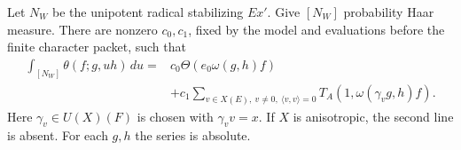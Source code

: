 \begin{srlemma}
\label{lem:sr-theta-kernel-constant-term}
Let \(N_W\) be the unipotent radical stabilizing \(Ex'\).
Give \([N_W]\) probability Haar measure. There are nonzero
\(c_0,c_1\), fixed by the model and evaluations before the finite
character packet, such that
\[
 \begin{split}
 \int_{[N_W]}\theta(f;g,uh)\,du
   ={}&c_0\Theta(e_0\omega(g,h)f)\\
     &+c_1\sum_{v\in X(E),\ v\ne0,\ \langle v,v\rangle=0}
       T_A(1,\omega(\gamma_vg,h)f).
 \end{split}
 \tag{T7}\label{eq:sr-theta-kernel-ct}
\]
Here \(\gamma_v\in U(X)(F)\) is chosen with \(\gamma_vv=x\).
If \(X\) is anisotropic, the second line is absent.
For each \(g,h\) the series is absolute.
\end{srlemma}

